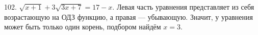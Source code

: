 102. $\sqrt{x+1}+3\sqrt{3x+7}=17-x.$ Левая часть уравнения представляет из себя возрастающую на ОДЗ функцию, а правая --- убывающую. Значит, у уравнения может быть только один корень, подбором найдём $x=3.$\\
